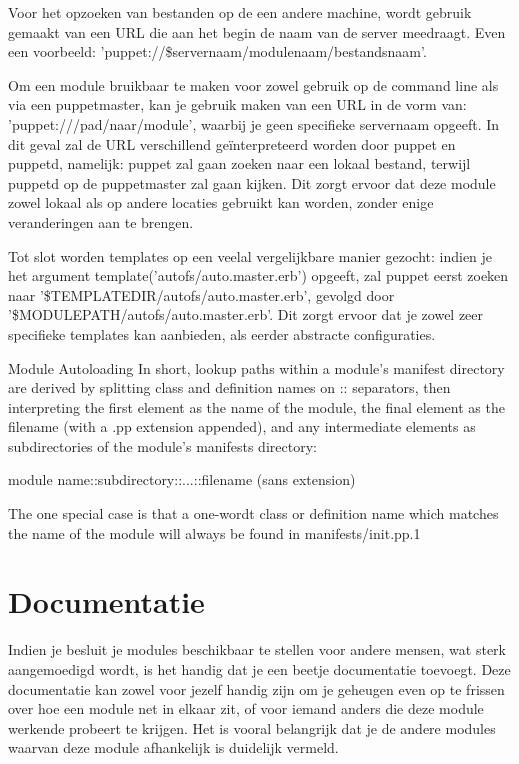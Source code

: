 Voor het opzoeken van bestanden op de een andere machine, wordt gebruik gemaakt van een URL die aan het begin de naam van de server meedraagt. Even een voorbeeld: 'puppet://\$servernaam/modulenaam/bestandsnaam'.

Om een module bruikbaar te maken voor zowel gebruik op de command line als via een puppetmaster, kan je gebruik maken van een URL in de vorm van: 'puppet:///pad/naar/module', waarbij je geen specifieke servernaam opgeeft. In dit geval zal de URL verschillend ge\"interpreteerd worden door puppet en puppetd, namelijk: puppet zal gaan zoeken naar een lokaal bestand, terwijl puppetd op de puppetmaster zal gaan kijken. Dit zorgt ervoor dat deze module zowel lokaal als op andere locaties gebruikt kan worden, zonder enige veranderingen aan te brengen.

Tot slot worden templates op een veelal vergelijkbare manier gezocht: indien je het argument template('autofs/auto.master.erb') opgeeft, zal puppet eerst zoeken naar '\$TEMPLATEDIR/autofs/auto.master.erb', gevolgd door '\$MODULEPATH/autofs/auto.master.erb'. Dit zorgt ervoor dat je zowel zeer specifieke templates kan aanbieden, als eerder abstracte configuraties.

Module Autoloading
In short, lookup paths within a module's manifest directory are derived by splitting class and definition names on :: separators, then interpreting the first element as the name of the module, the final element as the filename (with a .pp extension appended), and any intermediate elements as subdirectories of the module's manifests directory:

{module name}::{subdirectory}::{...}::{filename (sans extension)}

The one special case is that a one-wordt class or definition name which matches the name of the module will always be found in manifests/init.pp.1

\section{Documentatie}
Indien je besluit je modules beschikbaar te stellen voor andere mensen, wat sterk aangemoedigd wordt, is het handig dat je een beetje documentatie toevoegt. Deze documentatie kan zowel voor jezelf handig zijn om je geheugen even op te frissen over hoe een module net in elkaar zit, of voor iemand anders die deze module werkende probeert te krijgen. Het is vooral belangrijk dat je de andere modules waarvan deze module afhankelijk is duidelijk vermeld.
%
